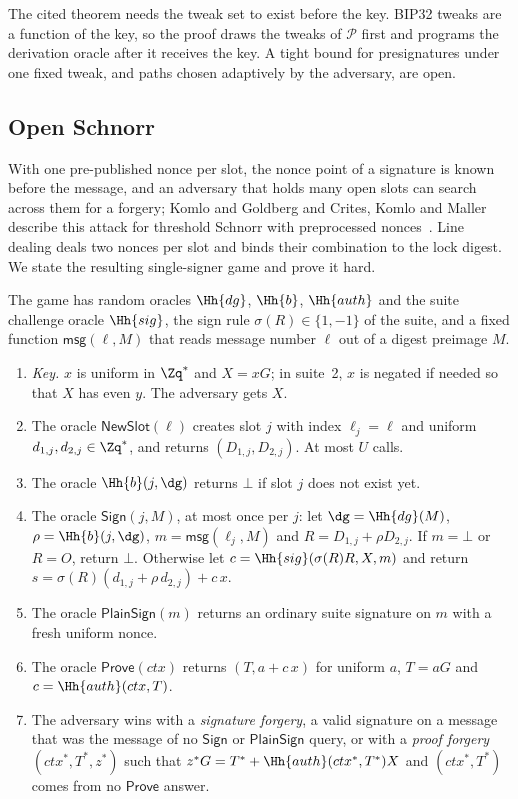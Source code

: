 The cited theorem needs the tweak set to exist before the key. BIP32 tweaks are a function of the key, so the proof draws the tweaks of $\mathcal{P}$ first and programs the derivation oracle after it receives the key. A tight bound for presignatures under one fixed tweak, and paths chosen adaptively by the adversary, are open.

\subsection{Open Schnorr}\label{sec:sec-schnorr}

With one pre-published nonce per slot, the nonce point of a signature is known before the message, and an adversary that holds many open slots can search across them for a forgery; Komlo and Goldberg and Crites, Komlo and Maller describe this attack for threshold Schnorr with preprocessed nonces~\cite{FROST,Sparkle}. Line dealing deals two nonces per slot and binds their combination to the lock digest. We state the resulting single-signer game and prove it hard.

\begin{definition}\label{def:tns}
The game has random oracles $\Hh{dg}$, $\Hh{b}$, $\Hh{auth}$ and the suite challenge oracle $\Hh{sig}$, the sign rule $\sigma(R) \in \{1, -1\}$ of the suite, and a fixed function $\mathsf{msg}(\ell, M)$ that reads message number $\ell$ out of a digest preimage $M$.
\begin{enumerate}[leftmargin=1.7em,itemsep=1pt]
\item \emph{Key.} $x$ is uniform in $\Zq^*$ and $X = xG$; in suite~2, $x$ is negated if needed so that $X$ has even $y$. The adversary gets $X$.
\item The oracle $\mathsf{NewSlot}(\ell)$ creates slot $j$ with index $\ell_j = \ell$ and uniform $d_{1,j}, d_{2,j} \in \Zq^*$, and returns $(D_{1,j}, D_{2,j})$. At most $U$ calls.
\item The oracle $\Hh{b}(j, \dg)$ returns $\bot$ if slot $j$ does not exist yet.
\item The oracle $\mathsf{Sign}(j, M)$, at most once per $j$: let $\dg = \Hh{dg}(M)$, $\rho = \Hh{b}(j, \dg)$, $m = \mathsf{msg}(\ell_j, M)$ and $R = D_{1,j} + \rho D_{2,j}$. If $m = \bot$ or $R = O$, return $\bot$. Otherwise let $c = \Hh{sig}(\sigma(R) R, X, m)$ and return $s = \sigma(R)(d_{1,j} + \rho\, d_{2,j}) + c\,x$.
\item The oracle $\mathsf{PlainSign}(m)$ returns an ordinary suite signature on $m$ with a fresh uniform nonce.
\item The oracle $\mathsf{Prove}(ctx)$ returns $(T, a + c\,x)$ for uniform $a$, $T = aG$ and $c = \Hh{auth}(ctx, T)$.
\item The adversary wins with a \emph{signature forgery}, a valid signature on a message that was the message of no $\mathsf{Sign}$ or $\mathsf{PlainSign}$ query, or with a \emph{proof forgery} $(ctx^*, T^*, z^*)$ such that $z^* G = T^* + \Hh{auth}(ctx^*, T^*) X$ and $(ctx^*, T^*)$ comes from no $\mathsf{Prove}$ answer.
\end{enumerate}
\end{definition}

